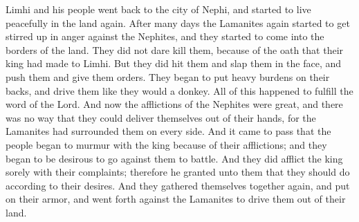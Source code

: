 \bchapter
\bverse \iffalse And it came to pass that Limhi and his people returned to the city of Nephi, and began to dwell in the land again in peace. \fi
Limhi and his people went back to the city of Nephi, and started to live peacefully in the land again.
\bverse \iffalse And it came to pass that after many days the Lamanites began again to be stirred up in anger against the Nephites, and they began to come into the borders of the land round about. \fi
After many days the Lamanites again started to get stirred up in anger against the Nephites, and they started to come into the borders of the land.
\bverse \iffalse Now they durst not slay them, because of the oath which their king had made unto Limhi; but they would smite them on their cheeks, and exercise authority over them; and began to put heavy burdens upon their backs, and drive them as they would a dumb ass-- \fi
They did not dare kill them, because of the oath that their king had made to Limhi. But they did hit them and slap them in the face, and push them and give them orders. They began to put heavy burdens on their backs, and drive them like they would a donkey.
\bverse \iffalse Yea, all this was done that the word of the Lord might be fulfilled. \fi
All of this happened to fulfill the word of the Lord.
\bverse \iffalse And now the afflictions of the Nephites were great, and there was no way that they could deliver themselves out of their hands, for the Lamanites had surrounded them on every side. \fi
And now the afflictions of the Nephites were great, and there was no way that they could deliver themselves out of their hands, for the Lamanites had surrounded them on every side.
\bverse \iffalse And it came to pass that the people began to murmur with the king because of their afflictions; and they began to be desirous to go against them to battle. And they did afflict the king sorely with their complaints; therefore he granted unto them that they should do according to their desires. \fi
And it came to pass that the people began to murmur with the king because of their afflictions; and they began to be desirous to go against them to battle. And they did afflict the king sorely with their complaints; therefore he granted unto them that they should do according to their desires.
\bverse \iffalse And they gathered themselves together again, and put on their armor, and went forth against the Lamanites to drive them out of their land. \fi
And they gathered themselves together again, and put on their armor, and went forth against the Lamanites to drive them out of their land.
